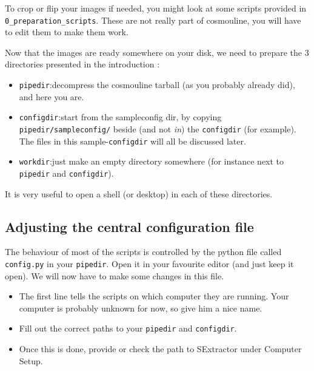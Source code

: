 To crop or flip your images if needed, you might look at some scripts provided in \\ \verb+0_preparation_scripts+. These are not really part of cosmouline, you will have to edit them to make them work.

Now that the images are ready somewhere on your disk, we need to prepare the 3 directories presented in the introduction :

\begin{itemize}

\item \verb+pipedir+:decompress the cosmouline tarball (as you probably already did), and here you are.

\item \verb+configdir+:start from the sampleconfig dir, by copying \verb+pipedir/sampleconfig/+ beside (and not \emph{in}) the \verb+configdir+ (for example). The files in this sample-\verb+configdir+ will all be discussed later.

\item \verb+workdir+:just make an empty directory somewhere (for instance next to \verb+pipedir+ and \verb+configdir+).

\end{itemize}

It is very useful to open a shell (or desktop) in each of these directories.

\subsection{Adjusting the central configuration file}


The behaviour of most of the scripts is controlled by the python file called \verb+config.py+ in your \verb+pipedir+. Open it in your favourite editor (and just keep it open). We will now have to make some changes in this file.

\begin{itemize}
 \item The first line tells the scripts on which computer they are running. Your computer is probably unknown for now, so give him a nice name.
\item Fill out the correct paths to your \verb+pipedir+ and \verb+configdir+.
\item Once this is done, provide or check the path to SExtractor under Computer Setup. 
\end{itemize}

